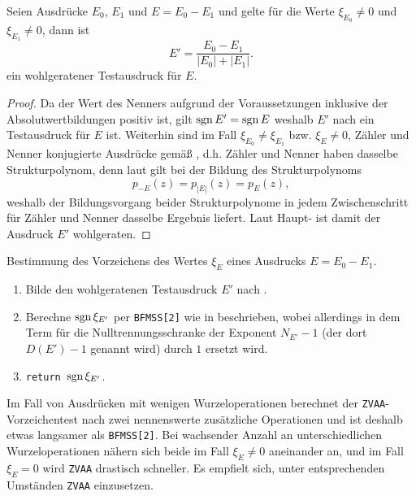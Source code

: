 \begin{theorem}\label{th:Ein wohlgeratener Testausdruck}
Seien Ausdrücke $E_0$, $E_1$ und $E=E_0-E_1$
und gelte für die Werte $\xi_{E_0}\ne 0$ und $\xi_{E_1}\ne 0$,
dann ist 
\begin{equation*}
  E' = \frac{E_0-E_1}{|E_0|+|E_1|}.
\end{equation*}
ein wohlgeratener Testausdruck für $E$.
\begin{proof}
Da der Wert des Nenners
aufgrund der Voraussetzungen inklusive der Absolutwertbildungen
positiv ist, gilt $\operatorname{sgn} E'=\operatorname{sgn} E$ 
weshalb $E'$ nach 
ein Testausdruck für $E$ ist.
Weiterhin sind im Fall $\xi_{E_0}\ne\xi_{E_1}$
bzw. $\xi_E\ne 0$, Zähler und Nenner 
konjugierte Ausdrücke gemäß ,
d.h. Zähler und Nenner haben dasselbe Strukturpolynom,
denn laut 
gilt bei der Bildung des Strukturpolynoms 
\begin{equation*}
p_{-E}(z) = p_{|E|}(z) = p_E(z),
\end{equation*}
weshalb der Bildungsvorgang beider Strukturpolynome
in jedem Zwischenschritt für Zähler und Nenner 
dasselbe Ergebnis liefert.
Laut Haupt-
ist damit der Ausdruck $E'$ wohlgeraten.
\end{proof}
\end{theorem}

\pagebreak
\begin{algorithm}\label{al:Vorzeichentest}
Bestimmung des Vorzeichens des Wertes $\xi_E$ 
eines Ausdrucks $E=E_0-E_1$.
\begin{enumerate}
\item Bilde den wohlgeratenen Testausdruck $E'$
      nach .
\item Berechne $\operatorname{sgn}\xi_{E'}$
      per {\tt BFMSS[2]} wie in \cite{BFMSS, PIYAP} beschrieben,
	  wobei allerdings in dem Term für die Nulltrennungsschranke
	  der Exponent $N_{E'}-1$ (der dort $D(E')-1$ genannt wird)
	  durch $1$ ersetzt wird.
\item {\tt return $\operatorname{sgn}\xi_{E'}$}.
\end{enumerate}
\end{algorithm}


\begin{remark}
Im Fall von Ausdrücken
mit wenigen Wurzeloperationen 
berechnet der {\tt ZVAA}-Vorzeichentest
nach 
zwei nennenswerte zusätzliche Operationen
und ist deshalb etwas langsamer als {\tt BFMSS[2]}.
Bei wachsender Anzahl an unterschiedlichen Wurzeloperationen 
nähern sich beide im Fall $\xi_E\ne 0$ aneinander an,
und im Fall $\xi_E=0$ wird {\tt ZVAA} drastisch schneller.
Es empfielt sich, unter entsprechenden Umständen {\tt ZVAA} einzusetzen.
\end{remark}
